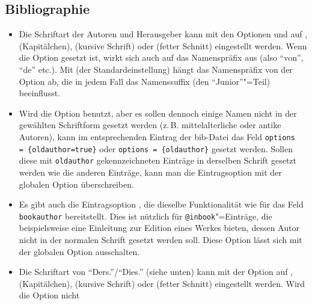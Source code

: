 \documentclass[ngerman]{scrartcl}
\begin{document}
\subsection{Bibliographie}
\begin{itemize}
	\item Die
	      Schriftart der Autoren und Herausgeber kann mit den Optionen%
				 und  auf , 
	      (Kapitälchen),  (kursive Schrift) oder 
	      (fetter Schnitt) eingestellt werden.
	      Wenn die Option  gesetzt ist, wirkt sich
	       auch auf das Namenspräfix aus (also \enquote{von},
	      \enquote{de} etc.).
	      Mit  (der Standardeinstellung) hängt das 
	      Namenspräfix von der Option  ab, die in jedem 
	      Fall
	      das Namenssuffix (den \enquote{Junior}"=Teil) beeinflusst.
	\item Wird
	      die Option  benutzt, aber es sollen dennoch 
	      einige Namen nicht in der gewählten Schriftform gesetzt werden (z.\,B.
	      mittelalterliche oder antike Autoren), kann im entsprechenden
	      Eintrag der bib-Datei das Feld \texttt{options\,=\,\{oldauthor=true\}} 
	      oder \texttt{options\,=\,\{oldauthor\}} gesetzt werden. Sollen diese
	      mit \texttt{oldauthor} gekennzeichneten Einträge in derselben Schrift
	      gesetzt werden wie die anderen Einträge, kann man die Eintragsoption
	      mit der globalen Option  überschreiben.
  \item Es gibt auch die Eintragsoption ,
        die dieselbe Funktionalität wie  für das Feld \texttt{bookauthor}
        bereitstellt. Dies ist nützlich für \texttt{@inbook}"=Einträge, die beispielsweise
        eine Einleitung zur Edition eines Werkes bieten, dessen Autor nicht in der normalen
        Schrift gesetzt werden soll. Diese Option lässt sich mit der globalen Option
         ausschalten.
	\item Die
	      Schriftart von \enquote{Ders.}\slash\enquote{Dies.} (siehe unten) 
	      kann mit der Option  auf , 
	       (Kapitälchen),  (kursive Schrift) oder 
	       (fetter Schnitt) eingestellt werden. Wird die Option nicht 

\end{itemize}
\end{document}
